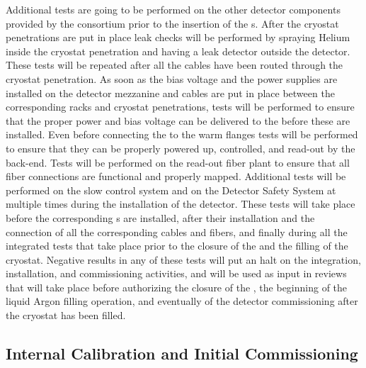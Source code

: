 Additional tests are going to be performed on the other detector components
provided by the  consortium prior to the insertion of the
s. After the cryostat penetrations are put in place leak checks
will be performed by spraying Helium inside the cryostat penetration and
having a leak detector outside the detector. These tests will be repeated 
after all the cables have been routed through the cryostat penetration.
As soon as the bias voltage and the power supplies are installed on the detector
mezzanine and cables are put in place between the corresponding racks and
cryostat penetrations, tests will be performed to ensure that the proper 
power and bias voltage can be delivered to the  before these
are installed. Even before connecting the  to the warm flanges
tests will be performed to ensure that they can be properly powered up, controlled,
and read-out by the  back-end. Tests will be performed on the
read-out fiber plant to ensure that all fiber connections are functional
and properly mapped. Additional tests will be performed on the slow control
system and on the Detector Safety System at multiple times during the
installation of the detector. These tests will take place before the
corresponding s are installed, after their installation and
the connection of all the corresponding cables and fibers, and finally
during all the integrated tests that take place prior to the closure of
the  and the filling of the cryostat. Negative results in any
of these tests will put an halt on the integration, installation, and
commissioning activities, and will be used as input in reviews that will
take place before authorizing the closure of the , the beginning
of the liquid Argon filling operation, and eventually of the detector 
commissioning after the cryostat has been filled.

\subsection{Internal Calibration and Initial Commissioning}
\label{sec:fdsp-tpcelec-integration-calib}

